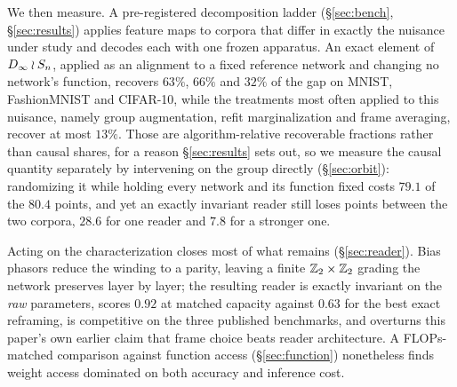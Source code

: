We then measure. A pre-registered decomposition ladder (\S\ref{sec:bench}, \S\ref{sec:results})
applies feature maps to corpora that differ in exactly the nuisance under study and decodes each
with one frozen apparatus. An exact element of $D_\infty \wr S_n$, applied as an alignment to a fixed
reference network and changing no network's function, recovers $63\%$, $66\%$ and $32\%$ of the gap
on MNIST, FashionMNIST and CIFAR-10, while the treatments most often applied to this nuisance,
namely group augmentation, refit marginalization and frame averaging, recover at most $13\%$. Those
are algorithm-relative recoverable fractions rather than causal shares, for a reason
\S\ref{sec:results} sets out, so we measure the causal quantity separately by intervening on the
group directly (\S\ref{sec:orbit}): randomizing it while holding every network and its function
fixed costs $79.1$ of the $80.4$ points, and yet an exactly invariant reader still loses points
between the two corpora, $28.6$ for one reader and $7.8$ for a stronger one.

Acting on the characterization closes most of what remains (\S\ref{sec:reader}). Bias phasors reduce
the winding to a parity, leaving a finite $\mathbb{Z}_2\times\mathbb{Z}_2$ grading the network preserves layer by
layer; the resulting reader is exactly invariant on the \emph{raw} parameters, scores $0.92$ at
matched capacity against $0.63$ for the best exact reframing, is competitive on the three published
benchmarks, and overturns this paper's own earlier claim that frame choice beats reader
architecture. A FLOPs-matched comparison against function access (\S\ref{sec:function}) nonetheless
finds weight access dominated on both accuracy and inference cost.
